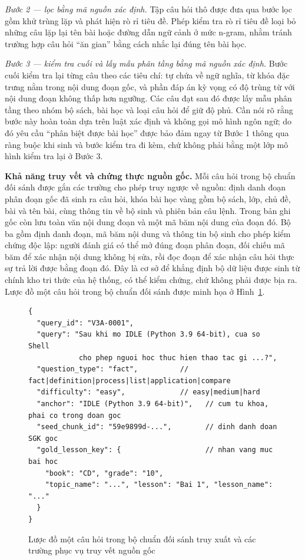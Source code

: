 \documentclass[../DoAn.tex]{subfiles}
\begin{document}
\textit{Bước 2 --- lọc bằng mã nguồn xác định.} Tập câu hỏi thô được đưa qua bước lọc gồm khử trùng lặp và phát hiện rò rỉ tiêu đề. Phép kiểm tra rò rỉ tiêu đề loại bỏ những câu lặp lại tên bài hoặc đường dẫn ngữ cảnh ở mức n-gram, nhằm tránh trường hợp câu hỏi ``ăn gian'' bằng cách nhắc lại đúng tên bài học.

\textit{Bước 3 --- kiểm tra cuối và lấy mẫu phân tầng bằng mã nguồn xác định.} Bước cuối kiểm tra lại từng câu theo các tiêu chí: tự chứa về ngữ nghĩa, từ khóa đặc trưng nằm trong nội dung đoạn gốc, và phần đáp án kỳ vọng có độ trùng từ với nội dung đoạn không thấp hơn ngưỡng. Các câu đạt sau đó được lấy mẫu phân tầng theo nhóm bộ sách, bài học và loại câu hỏi để giữ độ phủ. Cần nói rõ rằng bước này hoàn toàn dựa trên luật xác định và không gọi mô hình ngôn ngữ; do đó yêu cầu ``phân biệt được bài học'' được bảo đảm ngay từ Bước 1 thông qua ràng buộc khi sinh và bước kiểm tra đi kèm, chứ không phải bằng một lớp mô hình kiểm tra lại ở Bước 3.

\textbf{Khả năng truy vết và chứng thực nguồn gốc.} Mỗi câu hỏi trong bộ chuẩn đối sánh được gắn các trường cho phép truy ngược về nguồn: định danh đoạn phân đoạn gốc đã sinh ra câu hỏi, khóa bài học vàng gồm bộ sách, lớp, chủ đề, bài và tên bài, cùng thông tin về bộ sinh và phiên bản câu lệnh. Trong bản ghi gốc còn lưu toàn văn nội dung đoạn và một mã băm nội dung của đoạn đó. Bộ ba gồm định danh đoạn, mã băm nội dung và thông tin bộ sinh cho phép kiểm chứng độc lập: người đánh giá có thể mở đúng đoạn phân đoạn, đối chiếu mã băm để xác nhận nội dung không bị sửa, rồi đọc đoạn để xác nhận câu hỏi thực sự trả lời được bằng đoạn đó. Đây là cơ sở để khẳng định bộ dữ liệu được sinh từ chính kho tri thức của hệ thống, có thể kiểm chứng, chứ không phải được bịa ra. Lược đồ một câu hỏi trong bộ chuẩn đối sánh được minh họa ở Hình~\ref{fig:benchmark-schema}.

\begin{figure}[H]
\centering
\begin{lstlisting}[basicstyle=\ttfamily\footnotesize, frame=single, breaklines=true]
{
  "query_id": "V3A-0001",
  "query": "Sau khi mo IDLE (Python 3.9 64-bit), cua so Shell
            cho phep nguoi hoc thuc hien thao tac gi ...?",
  "question_type": "fact",          // fact|definition|process|list|application|compare
  "difficulty": "easy",             // easy|medium|hard
  "anchor": "IDLE (Python 3.9 64-bit)",   // cum tu khoa, phai co trong doan goc
  "seed_chunk_id": "59e9899d-...",        // dinh danh doan SGK goc
  "gold_lesson_key": {                    // nhan vang muc bai hoc
    "book": "CD", "grade": "10",
    "topic_name": "...", "lesson": "Bai 1", "lesson_name": "..."
  }
}
\end{lstlisting}
\caption{Lược đồ một câu hỏi trong bộ chuẩn đối sánh truy xuất và các trường phục vụ truy vết nguồn gốc}
\label{fig:benchmark-schema}
\end{figure}
\end{document}
